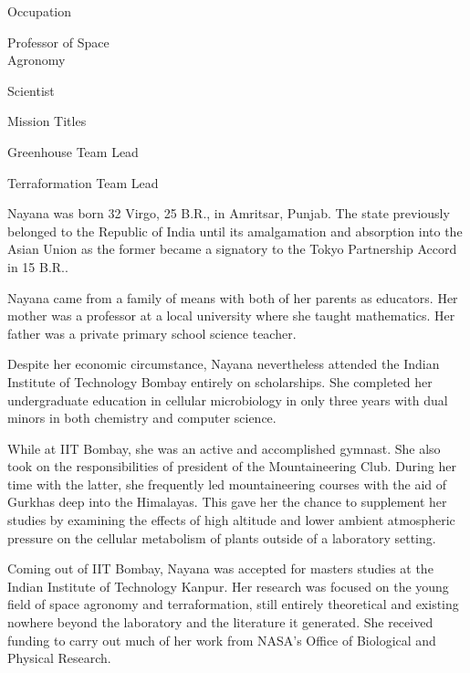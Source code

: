 {        \bTR
            \bTC Occupation \eTC
            \bTC
                \startitemize[4]
                \startpacked
                \item Professor of Space\\Agronomy
                \item Scientist
                \stoppacked
                \stopitemize
            \eTC
        \eTR
        
        \bTR
            \bTC Mission Titles \eTC
            \bTC
                \startitemize[4]
                \startpacked
                \item Greenhouse Team Lead
                \item Terraformation Team Lead
                \stoppacked
                \stopitemize
            \eTC
        \eTR
    \eTABLEbody

    \eTABLE
}

Nayana was born 32 Virgo, 25 B.R., in Amritsar, Punjab. The state previously belonged to the Republic of India until its amalgamation and absorption into the Asian Union as the former became a signatory to the Tokyo Partnership Accord in 15 B.R..

Nayana came from a family of means with both of her parents as educators. Her mother was a professor at a local university where she taught mathematics. Her father was a private primary school science teacher.

Despite her economic circumstance, Nayana nevertheless attended the Indian Institute of Technology Bombay entirely on scholarships. She completed her undergraduate education in cellular microbiology in only three years with dual minors in both chemistry and computer science.

While at IIT Bombay, she was an active and accomplished gymnast. She also took on the responsibilities of president of the Mountaineering Club. During her time with the latter, she frequently led mountaineering courses with the aid of Gurkhas deep into the Himalayas. This gave her the chance to supplement her studies by examining the effects of high altitude and lower ambient atmospheric pressure on the cellular metabolism of plants outside of a laboratory setting.

Coming out of IIT Bombay, Nayana was accepted for masters studies at the Indian Institute of Technology Kanpur. Her research was focused on the young field of space agronomy and terraformation, still entirely theoretical and existing nowhere beyond the laboratory and the literature it generated. She received funding to carry out much of her work from NASA's Office of Biological and Physical Research.

